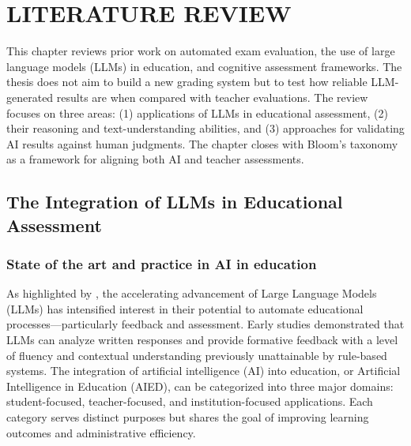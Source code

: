 \chapter{LITERATURE REVIEW}
\label{ch:lit review}

This chapter reviews prior work on automated exam evaluation, 
the use of large language models (LLMs) in education, and cognitive 
assessment frameworks. The thesis does not aim to build a new grading 
system but to test how reliable LLM-generated results are when compared 
with teacher evaluations. The review focuses on three areas: 
(1) applications of LLMs in educational assessment, (2) their reasoning 
and text-understanding abilities, and (3) approaches for validating AI 
results against human judgments. The chapter closes with Bloom’s 
taxonomy as a framework for aligning both AI and teacher assessments.

\section{The Integration of LLMs in Educational Assessment}

\subsection{State of the art and practice in AI in education}

As highlighted by \cite{Holmes2022}, the accelerating 
advancement of Large Language Models (LLMs) has intensified 
interest in their potential to automate educational 
processes—particularly feedback and assessment. Early studies 
demonstrated that LLMs can analyze written responses and 
provide formative feedback with a level of fluency and 
contextual understanding previously unattainable by 
rule-based systems. The integration of artificial 
intelligence (AI) into education, or Artificial Intelligence 
in Education (AIED), 
can be categorized into three major domains: student-focused, 
teacher-focused, and institution-focused applications. Each 
category serves distinct purposes but shares the goal of 
improving learning outcomes and administrative efficiency.

